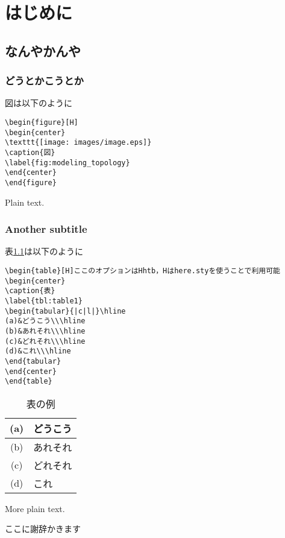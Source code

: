 \documentclass[11pt,a4j]{jreport}
\affiliation{大阪大学 基礎工学部 情報科学科}%
\begin{document}
\makepreambles

\chapter{はじめに}
\section{なんやかんや}


\subsection{どうとかこうとか}
図は以下のように
\begin{verbatim}
\begin{figure}[H]
\begin{center}
\texttt{[image: images/image.eps]}
\caption{図}
\label{fig:modeling_topology}
\end{center}
\end{figure}
\end{verbatim}
Plain text.


\subsection{Another subtitle}
表\ref{tbl:table1}は以下のように
\begin{verbatim}
\begin{table}[H]ここのオプションはHhtb，Hはhere.styを使うことで利用可能
\begin{center}
\caption{表}
\label{tbl:table1}
\begin{tabular}{|c|l|}\hline
(a)&どうこう\\\hline
(b)&あれそれ\\\hline
(c)&どれそれ\\\hline
(d)&これ\\\hline
\end{tabular}
\end{center}
\end{table}
\end{verbatim}
\begin{table}[H]
\begin{center}
\caption{表の例}
\label{tbl:table1}
\begin{tabular}{|c|l|}\hline
(a)&どうこう\cite{AODV}\\\hline
(b)&あれそれ\cite{DSR}\\\hline
(c)&どれそれ\cite{OLSR}\\\hline
(d)&これ\cite{mycom}\cite{ISSTA1994}\\\hline
\end{tabular}
\end{center}
\end{table}
More plain text\cite{ICTE2007}.



\acknowledgement%
ここに謝辞かきます






\end{document}
